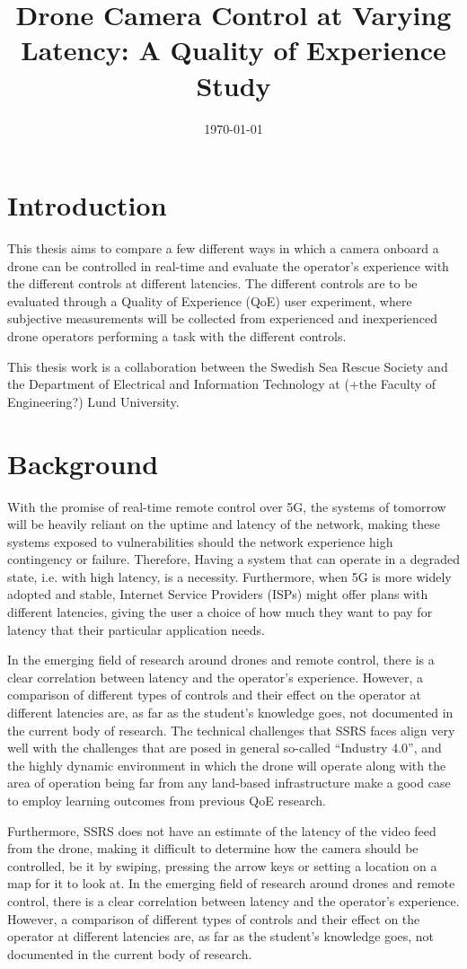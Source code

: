 \documentclass[nofilelist]{cslthse-msc}
\title{Drone Camera Control at Varying Latency: A Quality of Experience Study}
\date{\today}
\begin{document}
\renewcommand{\bibname}{References}

\makefrontmatter
\chapter{Introduction}
This thesis aims to compare a few different ways in which a camera onboard a drone can be controlled in real-time and evaluate the operator’s experience with the different controls at different latencies. The different controls are to be evaluated through a Quality of Experience (QoE) user experiment, where subjective measurements will be collected from experienced and inexperienced drone operators performing a task with the different controls.

This thesis work is a collaboration between the Swedish Sea Rescue Society and the Department of Electrical and Information Technology at (+the Faculty of Engineering?) Lund University. 

\chapter{Background}
With the promise of real-time remote control over 5G, the systems of tomorrow will be heavily reliant on the uptime and latency of the network, making these systems exposed to vulnerabilities should the network experience high contingency or failure. Therefore, Having a system that can operate in a degraded state, i.e. with high latency, is a necessity. Furthermore, when 5G is more widely adopted and stable, Internet Service Providers (ISPs) might offer plans with different latencies, giving the user a choice of how much they want to pay for latency that their particular application needs.  

In the emerging field of research around drones and remote control, there is a clear correlation between latency and the operator’s experience. However, a comparison of different types of controls and their effect on the operator at different latencies are, as far as the student’s knowledge goes, not documented in the current body of research. The technical challenges that SSRS faces align very well with the challenges that are posed in general so-called “Industry 4.0”, and the highly dynamic environment in which the drone will operate along with the area of operation being far from any land-based infrastructure make a good case to employ learning outcomes from previous QoE research. 

Furthermore, SSRS does not have an estimate of the latency of the video feed from the drone, making it difficult to determine how the camera should be controlled, be it by swiping, pressing the arrow keys or setting a location on a map for it to look at. In the emerging field of research around drones and remote control, there is a clear correlation between latency and the operator’s experience. However, a comparison of different types of controls and their effect on the operator at different latencies are, as far as the student’s knowledge goes, not documented in the current body of research.
\end{document}
